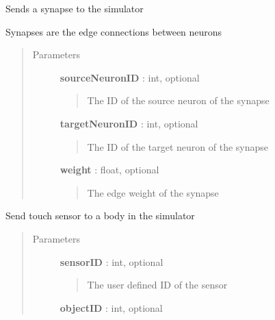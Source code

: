 \documentclass[letterpaper,10pt,english]{sphinxmanual}
\begin{document}
\begin{fulllineitems}

\begin{fulllineitems}
\label{code:pyrosim.PYROSIM.Send_Synapse}
Sends a synapse to the simulator

Synapses are the edge connections between neurons
\begin{quote}\begin{description}
\item[{Parameters}] \leavevmode
\textbf{sourceNeuronID} : int, optional
\begin{quote}

The ID of the source neuron of the synapse
\end{quote}

\textbf{targetNeuronID} : int, optional
\begin{quote}

The ID of the target neuron of the synapse
\end{quote}

\textbf{weight} : float, optional
\begin{quote}

The edge weight of the synapse
\end{quote}

\end{description}\end{quote}

\end{fulllineitems}


\begin{fulllineitems}
\label{code:pyrosim.PYROSIM.Send_Touch_Sensor}
Send touch sensor to a body in the simulator
\begin{quote}\begin{description}
\item[{Parameters}] \leavevmode
\textbf{sensorID} : int, optional
\begin{quote}

The user defined ID of the sensor
\end{quote}

\textbf{objectID} : int, optional
\begin{quote}


\end{quote}
\end{description}
\end{quote}
\end{fulllineitems}
\end{fulllineitems}
\end{document}
